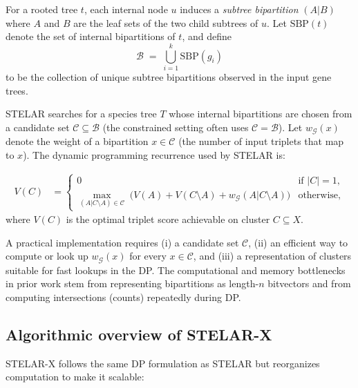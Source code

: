\documentclass[10pt,a4paper]{article}
\begin{document}
For a rooted tree $t$, each internal node $u$ induces a \emph{subtree bipartition} $(A\!|\!B)$ where $A$ and $B$ are the leaf sets of the two child subtrees of $u$. Let $\mathrm{SBP}(t)$ denote the set of internal bipartitions of $t$, and define
\[
\mathcal{B} \;=\; \bigcup_{i=1}^{k} \mathrm{SBP}(g_i)
\]
to be the collection of unique subtree bipartitions observed in the input gene trees.

STELAR searches for a species tree $T$ whose internal bipartitions are chosen from a candidate set $\mathcal{C}\subseteq\mathcal{B}$ (the constrained setting often uses $\mathcal{C}=\mathcal{B}$). Let $w_{\mathcal{G}}(x)$ denote the weight of a bipartition $x\in\mathcal{C}$ (the number of input triplets that map to $x$). The dynamic programming recurrence used by STELAR is:

\begin{align}
V(C) &= 
\begin{cases}
0 & \text{if }|C|=1,\\[4pt]
\displaystyle \max_{(A\!|\!C\setminus A)\in\mathcal{C}} \; \big( V(A) + V(C\setminus A) + w_{\mathcal{G}}(A\!|\!C\setminus A)\big) & \text{otherwise,}
\end{cases} \label{eq:dp}
\end{align}
where $V(C)$ is the optimal triplet score achievable on cluster $C\subseteq X$.

A practical implementation requires (i) a candidate set $\mathcal{C}$, (ii) an efficient way to compute or look up $w_{\mathcal{G}}(x)$ for every $x\in\mathcal{C}$, and (iii) a representation of clusters suitable for fast lookups in the DP. The computational and memory bottlenecks in prior work stem from representing bipartitions as length-$n$ bitvectors and from computing intersections (counts) repeatedly during DP.

\subsection{Algorithmic overview of STELAR-X}
\label{subsec:overview}

STELAR-X follows the same DP formulation as STELAR but reorganizes computation to make it scalable:
\end{document}
